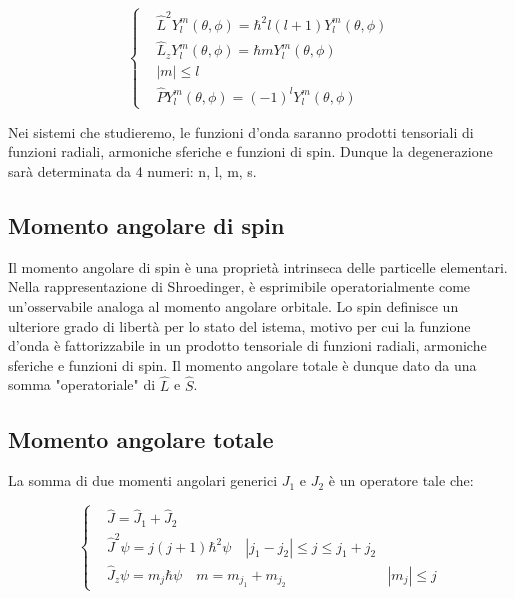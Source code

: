 \documentclass{article}
\begin{document}
\begin{equation}
    \left\{
    \begin{aligned}
         & \hat{L}^2Y^m_l(\theta,\phi)=\hbar^2l(l+1)Y^m_l(\theta,\phi) \\
         & \hat{L}_zY^m_l(\theta,\phi)=\hbar mY^m_l(\theta,\phi)       \\
         & |m|\leq l                                                   \\
         & \hat{P}Y^m_l(\theta,\phi)=(-1)^lY^m_l(\theta,\phi)
    \end{aligned}
    \right.
\end{equation}

Nei sistemi che studieremo, le funzioni d'onda saranno prodotti tensoriali di funzioni radiali, armoniche sferiche e funzioni di spin.
Dunque la degenerazione sarà determinata da 4 numeri: n, l, m, s.

\subsection{Momento angolare di spin}
Il momento angolare di spin è una proprietà intrinseca delle particelle elementari.
Nella rappresentazione di Shroedinger, è esprimibile operatorialmente come un'osservabile analoga al momento angolare orbitale.
Lo spin definisce un ulteriore grado di libertà per lo stato del istema, motivo per cui la funzione d'onda è fattorizzabile in un prodotto tensoriale di funzioni radiali, armoniche sferiche e funzioni di spin.
Il momento angolare totale è dunque dato da una somma "operatoriale" di $\hat{L}$ e $\hat{S}$.


\subsection{Momento angolare totale}
La somma di due momenti angolari generici $J_1$ e $J_2$ è un operatore tale che:

\begin{equation}
    \left\{
    \begin{aligned}
         & \hat{J}=\hat{J}_1+\hat{J}_2                                       \\
         & \hat{J}^2\psi=j(j+1)\hbar^2\psi \quad |j_1-j_2|\leq j\leq j_1+j_2 \\
         & \hat{J}_z\psi=m_j\hbar\psi \quad m=m_{j_1}+m_{j_2}
         & |m_j|\leq j
    \end{aligned}
    \right.
\end{equation}
\end{document}
